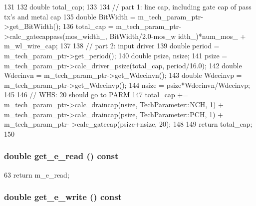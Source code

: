 \begin{DoxyCode}
131 {
132     double total_cap;
133 
134     // part 1: line cap, including gate cap of pass tx's and metal cap
135     double BitWidth = m_tech_param_ptr->get_BitWidth();
136     total_cap = m_tech_param_ptr->calc_gatecappass(mos_width_, BitWidth/2.0-mos_w
      idth_)*num_mos_ + m_wl_wire_cap;
137 
138     // part 2: input driver
139     double period = m_tech_param_ptr->get_period();
140     double psize, nsize;
141     psize = m_tech_param_ptr->calc_driver_psize(total_cap, period/16.0);
142     double Wdecinvn = m_tech_param_ptr->get_Wdecinvn();
143     double Wdecinvp = m_tech_param_ptr->get_Wdecinvp();
144     nsize = psize*Wdecinvn/Wdecinvp;
145 
146     // WHS: 20 should go to PARM
147     total_cap += m_tech_param_ptr->calc_draincap(nsize, TechParameter::NCH, 1) + 
      m_tech_param_ptr->calc_draincap(psize, TechParameter::PCH, 1) + m_tech_param_ptr-
      >calc_gatecap(psize+nsize, 20);
148 
149     return total_cap;
150 }
\end{DoxyCode}
\hypertarget{classWordlineUnit_ad2c407e628a0ef8df4eb995cf98a024f}{
\subsubsection[{get\_\-e\_\-read}]{\setlength{\rightskip}{0pt plus 5cm}double get\_\-e\_\-read () const}}
\label{classWordlineUnit_ad2c407e628a0ef8df4eb995cf98a024f}



\begin{DoxyCode}
63 { return m_e_read; }
\end{DoxyCode}
\hypertarget{classWordlineUnit_aa57a22237e96a10db0f785555cb5bb3c}{
\subsubsection[{get\_\-e\_\-write}]{\setlength{\rightskip}{0pt plus 5cm}double get\_\-e\_\-write () const}}
\label{classWordlineUnit_aa57a22237e96a10db0f785555cb5bb3c}



